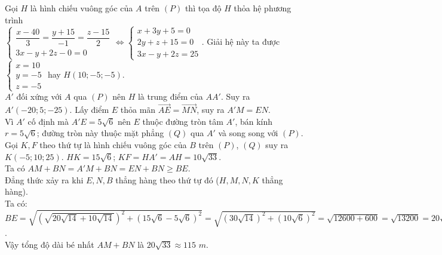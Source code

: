 \begin{ex}
{\begin{itemchoice}
			\itemch Gọi $H$ là hình chiếu vuông góc của $A$ trên $(P)$ thì tọa độ $H$ thỏa hệ phương trình\\ $\begin{cases} \dfrac{x - 40}{3} = \dfrac{y + 15}{-1} = \dfrac{z - 15}{2} \\ 3x - y + 2z - 0 = 0 \end{cases} \Leftrightarrow \begin{cases} x+3y+5=0 \\ 2y+z+15=0 \\ 3x-y+2z=25 \end{cases}$. Giải hệ này ta được $\begin{cases} x=10 \\ y=-5 \\ z=-5 \end{cases}$ hay $H(10; -5; -5)$.\\
			$A'$ đối xứng với $A$ qua $(P)$ nên $H$ là trung điểm của $AA'$. Suy ra $A'(-20; 5; -25)$.
			\itemch Lấy điểm $E$ thỏa mãn $\overrightarrow{AE} = \overrightarrow{MN}$, suy ra $A'M = EN$.\\
			Vì $A'$ cố định mà $A'E = 5\sqrt{6}$ nên $E$ thuộc đường tròn tâm $A'$, bán kính $r = 5\sqrt{6}$; đường tròn này thuộc mặt phẳng $(Q)$ qua $A'$ và song song với $(P)$.\\
			Gọi $K, F$ theo thứ tự là hình chiếu vuông góc của $B$ trên $(P)$, $(Q)$ suy ra $K(-5; 10; 25)$. $HK = 15\sqrt{6}$; $KF = HA' = AH = 10\sqrt{33}$.\\
			Ta có $AM + BN = A'M + BN = EN + BN \ge BE$.\\
			Đẳng thức xảy ra khi $E, N, B$ thẳng hàng theo thứ tự đó ($H, M, N, K$ thẳng hàng).\\
			Ta có: $BE = \sqrt{(\sqrt{20\sqrt{14}+10\sqrt{14}})^2 + (15\sqrt{6} - 5\sqrt{6})^2} = \sqrt{(30\sqrt{14})^2 + (10\sqrt{6})^2} = \sqrt{12600 + 600} = \sqrt{13200} = 20\sqrt{33}$.\\
			Vậy tổng độ dài bé nhất $AM + BN$ là $20\sqrt{33} \approx 115$ $m$.
		\end{itemchoice}
	}
\end{ex}

